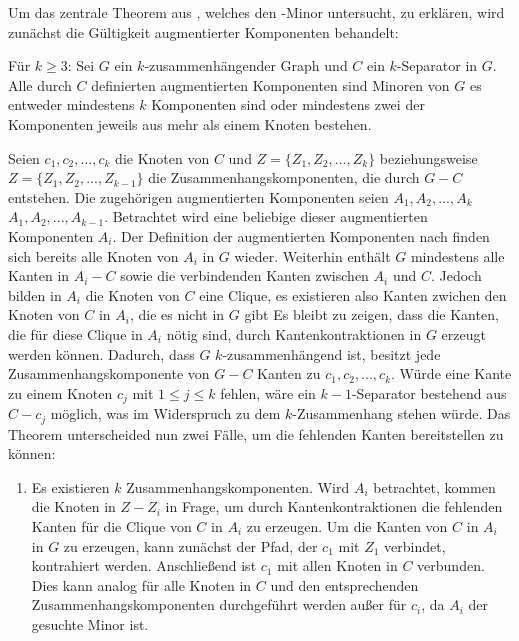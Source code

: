 Um das zentrale Theorem aus \cite{KeM92}, welches den \kdd-Minor untersucht, zu erklären, wird zunächst die Gültigkeit augmentierter Komponenten behandelt:
\begin{theorem}\label{eq:Theorem33}
  Für $k \geq 3$: Sei $G$ ein $k$-zusammenhängender Graph und $C$ ein $k$-Separator in $G$.
  Alle durch $C$ definierten augmentierten Komponenten sind Minoren von $G$ \gdw es entweder mindestens $k$ Komponenten sind oder mindestens zwei der Komponenten jeweils aus mehr als einem Knoten bestehen.
\end{theorem}
\begin{beweis}
  Seien $c_1, c_2, ..., c_k$ die Knoten von $C$ und $Z = \{Z_1, Z_2, ..., Z_k\}$ beziehungsweise $Z = \{Z_1, Z_2, ..., Z_{k-1}\}$ die Zusammenhangskomponenten, die durch $G - C$ entstehen.
  Die zugehörigen augmentierten Komponenten seien $A_1, A_2, ..., A_k$ \bzw $A_1, A_2, ..., A_{k-1}$.
  Betrachtet wird eine beliebige dieser augmentierten Komponenten $A_i$.
  Der Definition der augmentierten Komponenten nach finden sich bereits alle Knoten von $A_i$ in $G$ wieder. %
  Weiterhin enthält $G$ mindestens alle Kanten in $A_i - C$ sowie die verbindenden Kanten zwischen $A_i$ und $C$.
  Jedoch bilden in $A_i$ die Knoten von $C$ eine Clique, es existieren also \ggf Kanten zwichen den Knoten von $C$ in $A_i$, die es nicht in $G$ gibt
  Es bleibt zu zeigen, dass die Kanten, die für diese Clique in $A_i$ nötig sind, durch Kantenkontraktionen in $G$ erzeugt werden können.
  Dadurch, dass $G$ $k$-zusammenhängend ist, besitzt jede Zusammenhangskomponente von $G - C$ Kanten zu $c_1, c_2, ..., c_k$.
  Würde eine Kante zu einem Knoten $c_j$ mit $1 \leq j \leq k$ fehlen, wäre ein $k-1$-Separator bestehend aus $C - c_j$ möglich, was im Widerspruch zu dem $k$-Zusammenhang stehen würde.
  Das Theorem unterscheided nun zwei Fälle, um die fehlenden Kanten bereitstellen zu können:
  \begin{enumerate}
    \item Es existieren $k$ Zusammenhangskomponenten.
          Wird $A_i$ betrachtet, kommen die Knoten in $Z - Z_i$ in Frage, um durch Kantenkontraktionen die fehlenden Kanten für die Clique von $C$ in $A_i$ zu erzeugen.
          Um die Kanten von $C$ in $A_i$ in $G$ zu erzeugen, kann zunächst der Pfad, der $c_1$ mit $Z_1$ verbindet, kontrahiert werden.
          Anschließend ist $c_1$ mit allen Knoten in $C$ verbunden.
          Dies kann analog für alle Knoten in $C$ und den entsprechenden Zusammenhangskomponenten durchgeführt werden außer für $c_i$, da $A_i$ der gesuchte Minor ist.

\end{enumerate}
\end{beweis}
